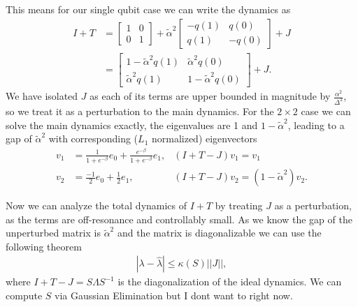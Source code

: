 \documentclass{article}
\newcommand{\abs}[1]{\left| #1 \right|}
\newcommand{\norm}[1]{\left| \left| #1 \right| \right|}
\begin{document}
This means for our single qubit case we can write the dynamics as
\begin{align}
    I + T &= \begin{bmatrix} 1 & 0 \\ 0 & 1 \end{bmatrix} + \widetilde{\alpha}^2 \begin{bmatrix} -q(1) & q(0) \\ q(1) & - q(0) \end{bmatrix} + J \\
    &= \begin{bmatrix} 1 - \widetilde{\alpha}^2 q(1) & \widetilde{\alpha}^2 q(0) \\ \widetilde{\alpha}^2 q(1) & 1 - \widetilde{\alpha}^2 q(0) \end{bmatrix} + J.
\end{align}
We have isolated $J$ as each of its terms are upper bounded in magnitude by $\frac{\alpha^2}{\Delta^2}$, so we treat it as a perturbation to the main dynamics. For the $2 \times 2$ case we can solve the main dynamics exactly, the eigenvalues are 1 and $1 - \widetilde{\alpha}^2$, leading to a gap of $\widetilde{\alpha}^2$ with corresponding ($L_1$ normalized) eigenvectors
\begin{align}
    v_1 &= \frac{1}{1 + e^{-\beta}} e_0 + \frac{e^{-\beta}}{1 + e^{-\beta}} e_1,  &(I + T - J) v_1 = v_1 \\
    v_2 &= \frac{-1}{2} e_0 + \frac{1}{2} e_1,  &(I + T - J) v_2 = (1 - \widetilde{\alpha}^2) v_2.
\end{align}

Now we can analyze the total dynamics of $I + T$ by treating $J$ as a perturbation, as the terms are off-resonance and controllably small. As we know the gap of the unperturbed matrix is $\widetilde{\alpha}^2$ and the matrix is diagonalizable we can use the following theorem 
\begin{align}
    \abs{\lambda - \hat{\lambda}} \le \kappa(S) \norm{J},
\end{align}
where $I + T - J = S \Lambda S^{-1}$ is the diagonalization of the ideal dynamics. We can compute $S$ via Gaussian Elimination but I dont want to right now. 
\end{document}
